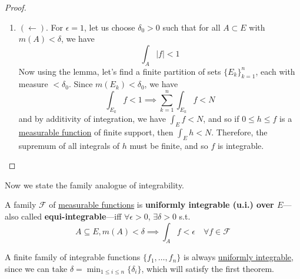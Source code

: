 \begin{proof}
\begin{enumerate}
      \item $(\leftarrow)$. For $\epsilon = 1$, let us choose $\delta_0 > 0$ such that for all $A \subset E$ with $m(A) < \delta$, we have
      \begin{equation}
        \int_A |f| < 1
      \end{equation}
      Now using the lemma, let's find a finite partition of sets $\{E_k\}_{k=1}^n$, each with measure $< \delta_0$. Since $m(E_k) < \delta_0$, we have 
      \begin{equation}
        \int_{E_k} f < 1 \implies \sum_{k=1}^n \int_{E_k} f < N
      \end{equation}
      and by additivity of integration, we have $\int_E f < N$, and so if $0 \leq h \leq f$ is a \hyperref[def:measurable-function]{measurable function} of finite support, then $\int_E h < N$. Therefore, the supremum of all integrals of $h$ must be finite, and so $f$ is integrable. 
    \end{enumerate}
  \end{proof}

  Now we state the family analogue of integrability. 

  \begin{definition}
    \label{def:uniformly-integrable}
    A family $\mathscr{F}$ of \hyperref[def:measurable-function]{measurable functions} is \textbf{uniformly integrable (u.i.) over $E$}---also called \textbf{equi-integrable}---iff $\forall \epsilon > 0$, $\exists \delta > 0$ s.t. 
    \begin{equation}
      A \subseteq E, m(A) < \delta \implies \int_A f < \epsilon \quad \forall f \in \mathscr{F}
    \end{equation}
  \end{definition}

  \begin{example}
    \label{ex:finite-family-of-integrable-functions-is-ui}
    A finite family of integrable functions $\{f_1, \ldots, f_n\}$ is always \hyperref[def:uniformly-integrable]{uniformly integrable}, since we can take $\delta = \min_{1 \leq i \leq n} \{\delta_i\}$, which will satisfy the first theorem. 
  \end{example}

